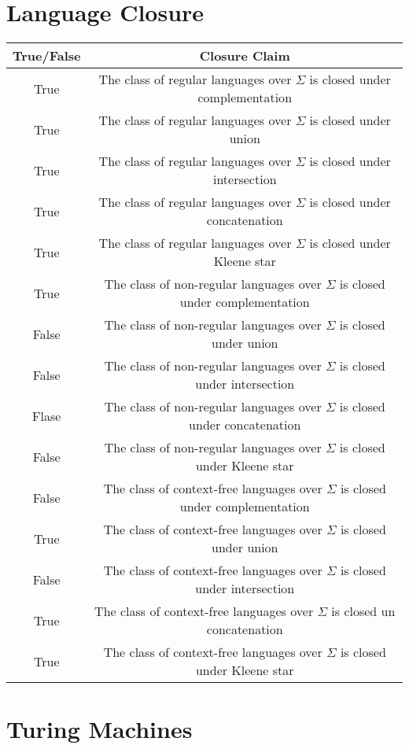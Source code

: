 \documentclass{article}
\begin{document}
\section{Language Closure}
\label{sec:langClose}
\begin{tabular}{c|c}
   True/False  & Closure Claim \\
   \hline
    True & The class of regular languages over $\Sigma$ is closed under complementation\\
    True & The class of regular languages over $\Sigma$ is closed under union\\
    True & The class of regular languages over $\Sigma$ is closed under intersection\\
    True & The class of regular languages over $\Sigma$ is closed under concatenation\\
    True & The class of regular languages over $\Sigma$ is closed under Kleene star\\
    True & The class of non-regular languages over $\Sigma$ is closed under complementation\\
    False & The class of non-regular languages over $\Sigma$ is closed under union\\
    False & The class of non-regular languages over $\Sigma$ is closed under intersection\\
    Flase & The class of non-regular languages over $\Sigma$ is closed under concatenation\\
    False & The class of non-regular languages over $\Sigma$ is closed under Kleene star\\
    False & The class of context-free languages over $\Sigma$ is closed under complementation\\
    True & The class of context-free languages over $\Sigma$ is closed under union\\
    False & The class of context-free languages over $\Sigma$ is closed under intersection\\
    True & The class of context-free languages over $\Sigma$ is closed un concatenation\\
    True & The class of context-free languages over $\Sigma$ is closed under Kleene star
\end{tabular}
\section{Turing Machines}
\label{sec:turing}
\end{document}
